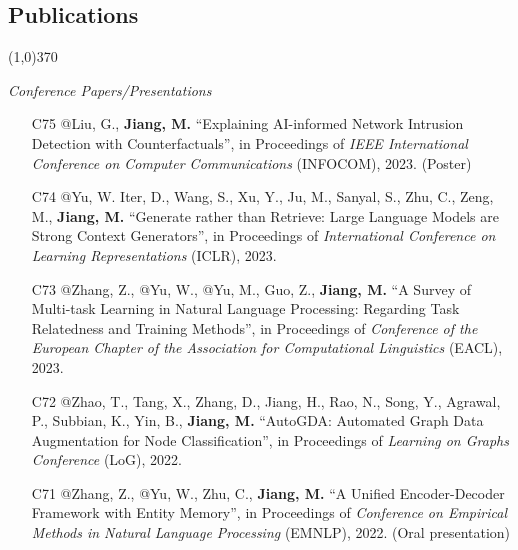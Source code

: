 \documentclass[10pt]{article}
\newenvironment{myindentpar}[1]%
{\begin{list}{}%
         {\setlength{\leftmargin}{#1}}%
         \item[]%
}
{\end{list}}
\newcounter{list}
\begin{document}
\subsection{}
\subsection{\sc Publications}
\vspace{-0.4cm} \line(1,0){370} \vspace{-0.1cm}

\begin{myindentpar}{0.00cm}

\hspace{-0.25cm}\textit{Conference Papers/Presentations}

\begin{enumerate}[leftmargin=.5cm]

\item[C75] @Liu, G., \textbf{Jiang, M.} ``Explaining AI-informed Network Intrusion Detection with Counterfactuals'', in Proceedings of \textit{IEEE International Conference on Computer Communications} (INFOCOM), 2023. (Poster)
		
\item[C74] @Yu, W. Iter, D., Wang, S., Xu, Y., Ju, M., Sanyal, S., Zhu, C., Zeng, M., \textbf{Jiang, M.} ``Generate rather than Retrieve: Large Language Models are Strong Context Generators'', in Proceedings of \textit{International Conference on Learning Representations} (ICLR), 2023.

\item[C73] @Zhang, Z., @Yu, W., @Yu, M., Guo, Z., \textbf{Jiang, M.} ``A Survey of Multi-task Learning in Natural Language Processing: Regarding Task Relatedness and Training Methods'', in Proceedings of \textit{Conference of the European Chapter of the Association for Computational Linguistics} (EACL), 2023.

\item[C72] @Zhao, T., Tang, X., Zhang, D., Jiang, H., Rao, N., Song, Y., Agrawal, P., Subbian, K., Yin, B., \textbf{Jiang, M.} ``AutoGDA: Automated Graph Data Augmentation for Node Classification'', in Proceedings of \textit{Learning on Graphs Conference} (LoG), 2022.

\item[C71] @Zhang, Z., @Yu, W., Zhu, C., \textbf{Jiang, M.} ``A Unified Encoder-Decoder Framework with Entity Memory'', in Proceedings of \textit{Conference on Empirical Methods in Natural Language Processing} (EMNLP), 2022. (Oral presentation)


\end{enumerate}
\end{myindentpar}
\end{document}
